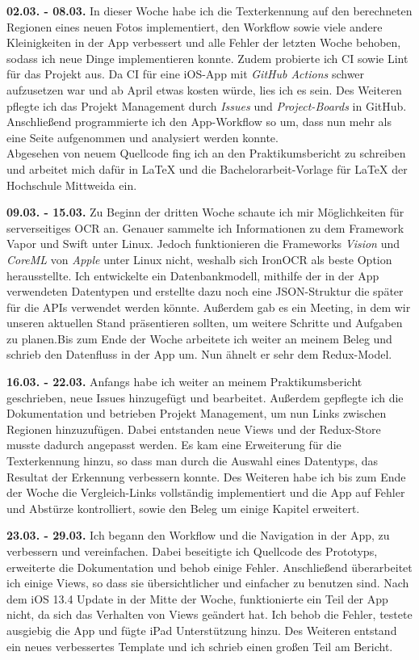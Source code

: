 \documentclass[nomenclature, oneside, 150]{HSMW-Thesis}
\begin{document}
	\textbf{02.03. - 08.03.} 
	In dieser Woche habe ich die Texterkennung auf den berechneten Regionen eines neuen Fotos implementiert, den Workflow sowie viele andere Kleinigkeiten in der App verbessert und alle Fehler der letzten Woche behoben, sodass ich neue Dinge implementieren konnte. Zudem probierte ich CI sowie Lint für das Projekt aus. Da CI für eine iOS-App mit \textit{GitHub Actions} schwer aufzusetzen war und ab April etwas kosten würde, lies ich es sein. Des Weiteren pflegte ich das Projekt Management durch \textit{Issues} und \textit{Project-Boards} in GitHub. Anschließend programmierte ich den App-Workflow so um, dass nun mehr als eine Seite aufgenommen und analysiert werden konnte. \\ 			
	Abgesehen von neuem Quellcode fing ich an den Praktikumsbericht zu schreiben und arbeitet mich dafür in \LaTeX \xspace und die Bachelorarbeit-Vorlage für \LaTeX \xspace der Hochschule Mittweida ein.
	
	\textbf{09.03. - 15.03.} 
	Zu Beginn der dritten Woche schaute ich mir Möglichkeiten für serverseitiges OCR an. Genauer sammelte ich Informationen zu dem Framework Vapor und Swift unter Linux. Jedoch funktionieren die Frameworks \textit{Vision} und \textit{CoreML} von \textit{Apple} unter Linux nicht, weshalb sich IronOCR als beste Option herausstellte. Ich entwickelte ein Datenbankmodell, mithilfe der in der App verwendeten Datentypen und erstellte dazu noch eine JSON-Struktur die später für die APIs verwendet werden könnte. Außerdem gab es ein Meeting, in dem wir unseren aktuellen Stand präsentieren sollten, um weitere Schritte und Aufgaben zu planen.Bis zum Ende der Woche arbeitete ich weiter an meinem Beleg und schrieb den Datenfluss in der App um. Nun ähnelt er sehr dem Redux-Model.
	
	\textbf{16.03. - 22.03.} 
	Anfangs habe ich weiter an meinem Praktikumsbericht geschrieben, neue Issues hinzugefügt und bearbeitet. Außerdem gepflegte ich die Dokumentation und betrieben Projekt Management, um nun Links zwischen Regionen hinzuzufügen. Dabei entstanden neue Views und der Redux-Store musste dadurch angepasst werden. Es kam eine Erweiterung für die Texterkennung hinzu, so dass man durch die Auswahl eines Datentyps, das Resultat der Erkennung verbessern konnte. Des Weiteren habe ich bis zum Ende der Woche die Vergleich-Links vollständig implementiert und die App auf Fehler und Abstürze kontrolliert, sowie den Beleg um einige Kapitel erweitert.
	
	\textbf{23.03. - 29.03.} 
	Ich begann den Workflow und die Navigation in der App, zu verbessern und vereinfachen. Dabei beseitigte ich Quellcode des Prototyps, erweiterte die Dokumentation und behob einige Fehler. Anschließend überarbeitet ich einige Views, so dass sie übersichtlicher und einfacher zu benutzen sind. Nach dem iOS 13.4 Update in der Mitte der Woche, funktionierte ein Teil der App nicht, da sich das Verhalten von Views geändert hat. Ich behob die Fehler, testete ausgiebig die App und fügte iPad Unterstützung hinzu. Des Weiteren entstand ein neues verbessertes Template und ich schrieb einen großen Teil am Bericht.
	
\end{document}
